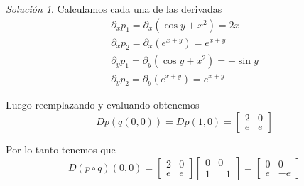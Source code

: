 \documentclass[a4paper,oneside,10.5pt]{article}
\theoremstyle{definition}
\theoremstyle{plain}
\theoremstyle{remark}
\theoremstyle{theorem}
\newtheorem{sol}{Solución}
\begin{document}
\begin{sol}
Calculamos cada una de las derivadas
\begin{gather*}
    \partial_x p_1 = \partial_x (\cos y + x^2) = 2x\\
    \partial_x p_2 = \partial_x (e^{x + y}) = e^{x + y}\\
    \partial_y p_1 = \partial_y (\cos y + x^2) = -\sin y\\
    \partial_y p_2 = \partial_y (e^{x + y}) = e^{x + y}
\end{gather*}

Luego reemplazando y evaluando obtenemos
\begin{equation*}
    Dp(q(0, 0)) = Dp(1, 0) = \begin{bmatrix}
        2 & 0\\
        e & e
    \end{bmatrix}
\end{equation*}

Por lo tanto tenemos que
\begin{equation*}
    D(p \circ q)(0, 0) = \begin{bmatrix}
        2 & 0\\
        e & e
    \end{bmatrix}\begin{bmatrix}
        0 & 0\\
        1 & -1
    \end{bmatrix} = \begin{bmatrix}
        0 & 0\\ e & -e
    \end{bmatrix}
\end{equation*}
\end{sol}
\end{document}
